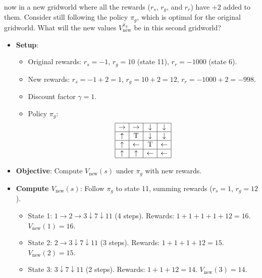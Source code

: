 \documentclass[a3paper,12pt]{extarticle} %
\begin{document}
\begin{enumerate}
    now in a new gridworld where all the rewards ($r_s$, $r_g$, and $r_r$) have $+2$ added to them. Consider still
    following the policy $\pi_g$, which is optimal for the original gridworld. What will the new values $V^{\pi_g}_{\text{new}}$ be
    in this second gridworld?

    \begin{itemize}
        \item \textbf{Setup}:
        \begin{itemize}
            \item Original rewards: \( r_s = -1 \), \( r_g = 10 \) (state 11), \( r_r = -1000 \) (state 6).
            \item New rewards: \( r_s = -1 + 2 = 1 \), \( r_g = 10 + 2 = 12 \), \( r_r = -1000 + 2 = -998 \).
            \item Discount factor \( \gamma = 1 \).
            \item Policy \( \pi_g \):
            \[
            \begin{array}{|c|c|c|c|}
            \hline
            \rightarrow & \rightarrow & \downarrow & \downarrow \\
            \hline
            \uparrow & \text{T} & \downarrow & \downarrow \\
            \hline
            \uparrow & \leftarrow & \text{T} & \leftarrow \\
            \hline
            \uparrow & \uparrow & \leftarrow & \leftarrow \\
            \hline
            \end{array}
            \]
        \end{itemize}
        \item \textbf{Objective}: Compute \( V_{\text{new}}(s) \) under \( \pi_g \) with new rewards.
        \item \textbf{Compute \( V_{\text{new}}(s) \)}: Follow \( \pi_g \) to state 11, summing rewards (\( r_s = 1 \), \( r_g = 12 \)).
        \begin{itemize}
            \item State 1: \( 1 \rightarrow 2 \rightarrow 3 \downarrow 7 \downarrow 11 \) (4 steps). Rewards: \( 1 + 1 + 1 + 1 + 12 = 16 \). \( V_{\text{new}}(1) = 16 \).
            \item State 2: \( 2 \rightarrow 3 \downarrow 7 \downarrow 11 \) (3 steps). Rewards: \( 1 + 1 + 1 + 12 = 15 \). \( V_{\text{new}}(2) = 15 \).
            \item State 3: \( 3 \downarrow 7 \downarrow 11 \) (2 steps). Rewards: \( 1 + 1 + 12 = 14 \). \( V_{\text{new}}(3) = 14 \).

\end{itemize}
\end{itemize}
\end{enumerate}
\end{document}

